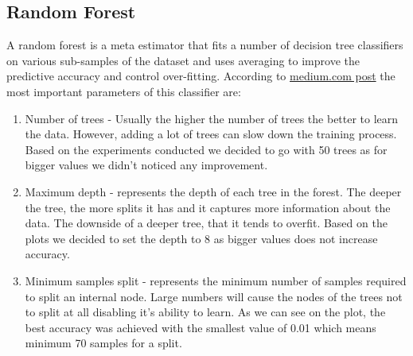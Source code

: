 \documentclass[12pt]{article}
\begin{document}
\subsection{Random Forest}
A random forest is a meta estimator that fits a number of decision tree classifiers on various sub-samples of the dataset and uses averaging to improve the predictive accuracy and control over-fitting. According to \href{https://medium.com/all-things-ai/in-depth-parameter-tuning-for-random-forest-d67bb7e920d}{medium.com post} the most important parameters of this classifier are:
\begin{enumerate}
	\item Number of trees - Usually the higher the number of trees the better to learn the data. However, adding a lot of trees can slow down the training process. Based on the experiments conducted we decided to go with 50 trees as for bigger values we didn't noticed any improvement.
	\item Maximum depth - represents the depth of each tree in the forest. The deeper the tree, the more splits it has and it captures more information about the data. The downside of a deeper tree, that it tends to overfit. Based on the plots we decided to set the depth to 8 as bigger values does not increase accuracy.
	\item Minimum samples split - represents the minimum number of samples required to split an internal node. Large numbers will cause the nodes of the trees not to split at all disabling it's ability to learn. As we can see on the plot, the best accuracy was achieved with the smallest value of 0.01 which means minimum 70 samples for a split.
\end{enumerate}
\end{document}
